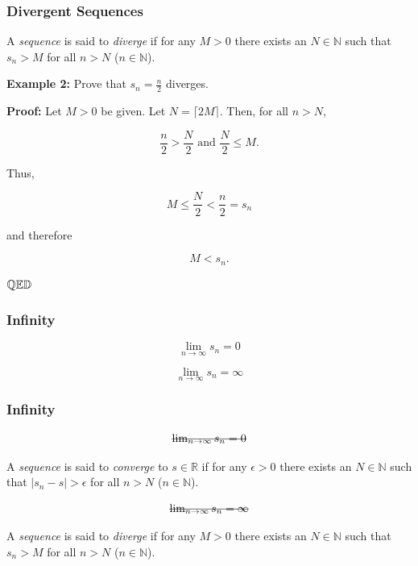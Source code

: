 \documentclass[10pt]{beamer}
\def\R{\mathbb{R}}                     %
\def\N{\mathbb{N}}                     %
\def\Q{\mathbb{Q}}                     %
\def\D{\mathbb{D}}                     %
\def\qed{ \hspace*{\fill} \Q \mathbb{E} \D}
\newcommand{\stkout}[1]{\ifmmode\text{\sout{\ensuremath{#1}}}\else\sout{#1}\fi}
\begin{document}
\begin{frame}
  \frametitle{Divergent Sequences}

  A \textit{sequence} is said to \textit{diverge} if for any $M > 0$ there exists an $N \in \N$ such that $s_n > M$ for all $n > N$ ($n \in \N$).
  \vspace{5mm}

  \textbf{Example 2:} Prove that $s_n = \frac{n}{2}$ diverges. \pause
  \vspace{5mm}

  \textbf{Proof:} Let $M > 0$ be given. \pause Let $N = \lceil 2M \rceil $. Then, for all $n > N$, \pause

  \[ \frac{n}{2} > \frac{N}{2} \text{ and } \frac{N}{2} \le M. \] \pause

  Thus,

  \[ M \le \frac{N}{2} < \frac{n}{2} = s_n \] \pause

  and therefore

  \[ M < s_n. \] \pause

  $\qed$

\end{frame}




\begin{frame}
  \frametitle{Infinity}

  \[ \lim_{n \to \infty} s_n = 0 \]

  \[ \lim_{n \to \infty} s_n = \infty \]

\end{frame}

\begin{frame}
  \frametitle{Infinity}


  \[ \stkout{ \lim_{n \to \infty} s_n = 0 } \]

  A \textit{sequence} is said to \textit{converge} to $s \in \R$ if for any $\epsilon > 0$ there exists an $N \in \N$ such that $\vert s_n - s \vert > \epsilon$ for all $n > N$ ($n \in \N$).

  \[ \stkout{ \lim_{n \to \infty} s_n = \infty } \]

  A \textit{sequence} is said to \textit{diverge} if for any $M > 0$ there exists an $N \in \N$ such that $s_n > M$ for all $n > N$ ($n \in \N$).


\end{frame}
\end{document}
